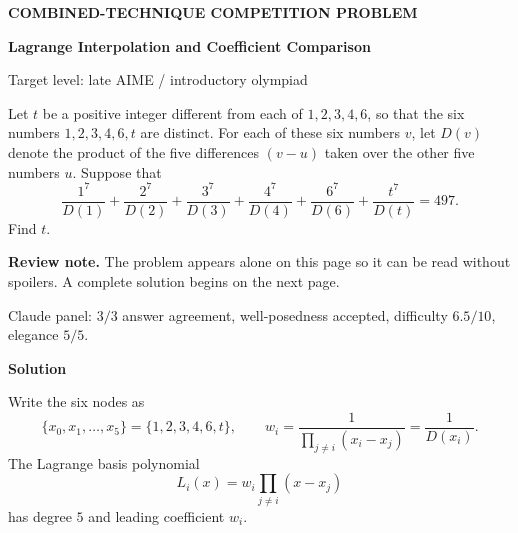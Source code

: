 \documentclass[11pt]{article}
\begin{document}
\begin{center}
  {\small\bfseries\color{blue}COMBINED-TECHNIQUE COMPETITION PROBLEM}\par
  \vspace{0.45em}
  {\LARGE\bfseries\color{navy}Lagrange Interpolation and Coefficient Comparison}\par
  \vspace{0.45em}
  {\color{muted}Target level: late AIME / introductory olympiad}\par
\end{center}

\vspace{1em}

\begin{problembox}
Let $t$ be a positive integer different from each of $1,2,3,4,6$, so that the
six numbers $1,2,3,4,6,t$ are distinct. For each of these six numbers $v$, let
$D(v)$ denote the product of the five differences $(v-u)$ taken over the other
five numbers $u$. Suppose that
\[
  \frac{1^{7}}{D(1)}+
  \frac{2^{7}}{D(2)}+
  \frac{3^{7}}{D(3)}+
  \frac{4^{7}}{D(4)}+
  \frac{6^{7}}{D(6)}+
  \frac{t^{7}}{D(t)}=497.
\]
Find $t$.
\end{problembox}

\vspace{1.2em}

\begin{center}
\begin{minipage}{0.82\textwidth}
\small\color{muted}
\textbf{Review note.} The problem appears alone on this page so it can be read
without spoilers. A complete solution begins on the next page.
\end{minipage}
\end{center}

\vfill

\begin{center}
  \small\color{muted}
  Claude panel: $3/3$ answer agreement, well-posedness accepted, difficulty $6.5/10$,
  elegance $5/5$.
\end{center}

\newpage

\begin{center}
  {\Large\bfseries\color{navy}Solution}\par
\end{center}

\begingroup
\small
\setlength{\parskip}{0.28em}

Write the six nodes as
\[
  \{x_0,x_1,\ldots,x_5\}=\{1,2,3,4,6,t\},
  \qquad
  w_i=\frac{1}{\prod_{j\ne i}(x_i-x_j)}=\frac{1}{D(x_i)}.
\]
The Lagrange basis polynomial
\[
  L_i(x)=w_i\prod_{j\ne i}(x-x_j)
\]
has degree $5$ and leading coefficient $w_i$.
\end{document}
